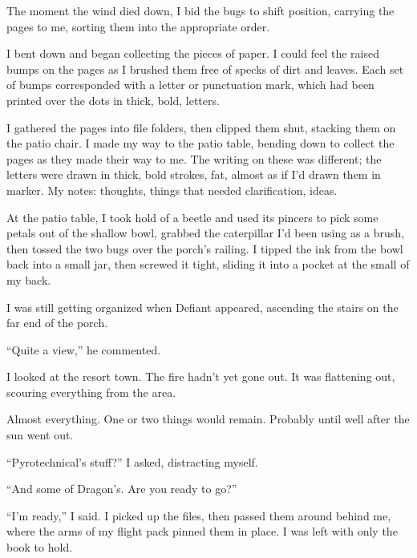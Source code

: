 The moment the wind died down, I bid the bugs to shift position, carrying the pages to me, sorting them into the appropriate order.



I bent down and began collecting the pieces of paper.  I could feel the raised bumps on the pages as I brushed them free of specks of dirt and leaves.  Each set of bumps corresponded with a letter or punctuation mark, which had been printed over the dots in thick, bold, letters.



I gathered the pages into file folders, then clipped them shut, stacking them on the patio chair.  I made my way to the patio table, bending down to collect the pages as they made their way to me.  The writing on these was different; the letters were drawn in thick, bold strokes, fat, almost as if I'd drawn them in marker.  My notes: thoughts, things that needed clarification, ideas.



At the patio table, I took hold of a beetle and used its pincers to pick some petals out of the shallow bowl, grabbed the caterpillar I'd been using as a brush, then tossed the two bugs over the porch's railing.  I tipped the ink from the bowl back into a small jar, then screwed it tight, sliding it into a pocket at the small of my back.



I was still getting organized when Defiant appeared, ascending the stairs on the far end of the porch.



``Quite a view,'' he commented.



I looked at the resort town.  The fire hadn't yet gone out.  It was flattening out, scouring everything from the area.



Almost everything.  One or two things would remain.  Probably until well after the sun went out.



``Pyrotechnical's stuff?''  I asked, distracting myself.



``And some of Dragon's.  Are you ready to go?''



``I'm ready,'' I said.  I picked up the files, then passed them around behind me, where the arms of my flight pack pinned them in place.  I was left with only the book to hold.



